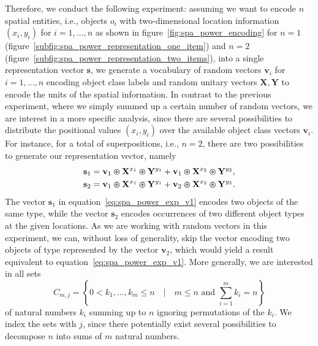 Therefore, we conduct the following experiment: assuming we want to encode $n$ spatial entities, i.e., objects $o_{i}$ with two-dimensional location information $ \left(x_{i}, y_{i}\right)$ for $i=1, \ldots, n$ as shown in figure~\ref{fig:spa_power_encoding} for $n=1$ (figure~\ref{subfig:spa_power_representation_one_item}) and $n=2$ (figure~\ref{subfig:spa_power_representation_two_items}), into a single representation vector $ \mathbf{s}$, we generate a vocabulary of random vectors $
\mathbf{v}_{i}$ for $i=1, \ldots, n$ encoding object class labels and random unitary vectors $ \mathbf{X}, \mathbf{Y}$ to encode the units of the spatial information.
In contrast to the previous experiment, where we simply summed up a certain number of random vectors, we are interest in a more specific analysis, since there are several possibilities to distribute the positional values $ \left(x_{i}, y_{i}\right)$ over the available object class vectors $ \mathbf{v}_{i}$.
For instance, for a total of superpositions, i.e., $n=2$, there are two possibilities to generate our representation vector, namely
\begin{align}
    \mathbf{s}_{1} &= \mathbf{v}_{1} \varoast \mathbf{X}^{x_{1}} \varoast \mathbf{Y}^{y_{1}} + \mathbf{v}_{1} \varoast \mathbf{X}^{x_{2}} \varoast \mathbf{Y}^{y_{2}}, \label{eq:spa_power_exp_v1} \\
    \mathbf{s}_{2} &= \mathbf{v}_{1} \varoast \mathbf{X}^{x_{1}} \varoast \mathbf{Y}^{y_{1}} + \mathbf{v}_{2} \varoast \mathbf{X}^{x_{2}} \varoast \mathbf{Y}^{y_{2}}. \label{eq:spa_power_exp_v2} 
\end{align}
The vector $ \mathbf{s}_{1}$ in equation~\eqref{eq:spa_power_exp_v1} encodes two objects of the same type, while the vector $ \mathbf{s}_{2}$ encodes occurrences of two different object types at the given locations.
As we are working with random vectors in this experiment, we can, without loss of generality, skip the vector encoding two objects of type represented by the vector $ \mathbf{v}_{2}$, which would yield a result equivalent to equation~\eqref{eq:spa_power_exp_v1}.
More generally, we are interested in all sets
\begin{equation}
\label{eq:sum_combinations}
C_{m,j} = \left\{0 < k_{1}, \ldots, k_{m} \leq n \quad | \quad m \leq n \textrm{ and } \sum\limits_{i=1}^{m} k_{i} = n \right\}
\end{equation}
of natural numbers $k_{i}$ summing up to $n$ ignoring permutations of the $k_{i}$. 
We index the sets with $j$, since there potentially exist several possibilities to decompose $n$ into sums of $m$ natural numbers.

